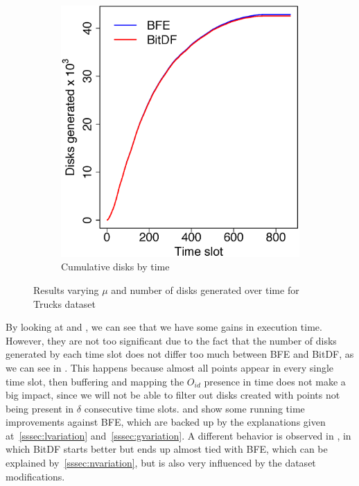 {\begin{figure}[h!]
\begin{subfigure}[t]{0.48\textwidth}
        \includegraphics[width=\textwidth]{images/Trucks_d.eps}
        \caption{Cumulative disks by time}
        \label{fig:trucks_disks}
    \end{subfigure}
    \caption{Results varying $\mu$ and number of disks generated over time for Trucks dataset}
    \label{fig:trucks_results2}
\end{figure}

By looking at  and , we can see that we have some gains in
execution time. However, they are not too significant due to the fact that the number of disks generated by each time
slot does not differ too much between BFE and BitDF, as we can see in . This happens because
almost all points appear in every single time slot, then buffering and mapping the $O_{id}$ presence in time does not
make a big impact, since we will not be able to filter out disks created with points not being present in $\delta$
consecutive time slots.   and  show some running time improvements
against BFE, which are backed up by the explanations given at~\ref{sssec:lvariation} and~\ref{sssec:gvariation}. A
different behavior is observed in , in which BitDF starts better but ends up almost tied with
BFE, which can be explained by~\ref{sssec:nvariation}, but is also very influenced by the dataset modifications.

}
